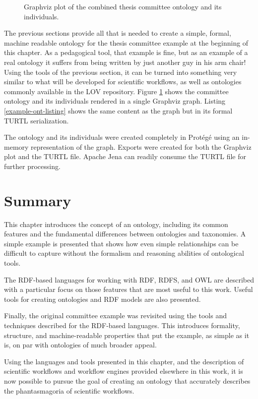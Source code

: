 \begin{figure}[htbp]
\centering
{}
\caption{Graphviz plot of the combined thesis committee ontology and its
individuals.}
\label{example-ont-graphic}
\end{figure}

The previous sections provide all that is needed to create a simple,
formal, machine readable ontology for the thesis committee example at the
beginning of this chapter. As a pedagogical tool, that example is fine, but as
an example of a real ontology it suffers from being written by just another guy
in his arm chair! Using the tools of the previous section, it can be turned
into something very similar to what will be developed for scientific workflows,
as well as ontologies commonly available in the LOV
repository. Figure \ref{example-ont-graphic} shows the committee ontology and
its individuals rendered in a single Graphviz graph. Listing
\ref{example-ont-listing} shows the same content as the graph but in its
formal TURTL serialization.



The ontology and its individuals were created completely in Prot\'eg\'e using an
in-memory representation of the graph. Exports were created for both the
Graphviz plot and the TURTL file. Apache Jena can readily consume the TURTL file
for further processing.

\section{Summary}

This chapter introduces the concept of an ontology, including its common
features and the fundamental differences between ontologies and taxonomies. A
simple example is presented that shows how even simple relationships can be
difficult to capture without the formalism and reasoning abilities of
ontological tools.

The RDF-based languages for working with RDF, RDFS, and OWL are described with
a particular focus on those features that are most useful to this work. Useful
tools for creating ontologies and RDF models are also presented.

Finally, the original committee example was revisited using the tools and
techniques described for the RDF-based languages. This introduces formality,
structure, and machine-readable properties that put the example, as simple as it
is, on par with ontologies of much broader appeal.

Using the languages and tools presented in this chapter, and the description of
scientific workflows and workflow engines provided elsewhere in this work, it is
now possible to pursue the goal of creating an ontology that accurately
describes the phantasmagoria of scientific workflows.
